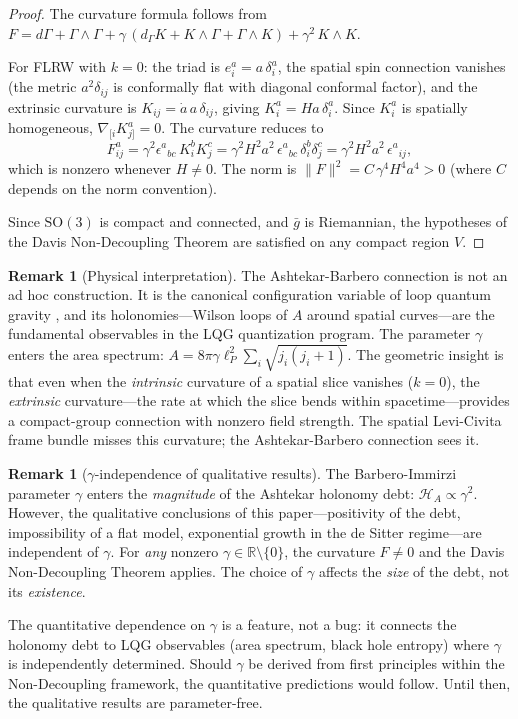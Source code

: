 \documentclass[12pt]{amsart}
\theoremstyle{definition}
\newtheorem{remark}[theorem]{Remark}
\newcommand{\R}{\mathbb{R}}
\begin{document}
\begin{proof}
The curvature formula follows from $F = d\Gamma + \Gamma \wedge \Gamma + \gamma\,(d_\Gamma K + K \wedge \Gamma + \Gamma \wedge K) + \gamma^2\, K \wedge K$.

For FLRW with $k = 0$: the triad is $e^a_i = a\,\delta^a_i$, the spatial spin connection vanishes (the metric $a^2\delta_{ij}$ is conformally flat with diagonal conformal factor), and the extrinsic curvature is $K_{ij} = \dot{a}\,a\,\delta_{ij}$, giving $K^a_i = Ha\,\delta^a_i$.  Since $K^a_i$ is spatially homogeneous, $\nabla_{[i}K^a_{j]} = 0$.  The curvature reduces to
\[
F^a_{ij} = \gamma^2\epsilon^a{}_{bc}\,K^b_i K^c_j = \gamma^2 H^2 a^2\,\epsilon^a{}_{bc}\,\delta^b_i\delta^c_j = \gamma^2 H^2 a^2\,\epsilon^a{}_{ij},
\]
which is nonzero whenever $H \neq 0$.  The norm is $\|F\|^2 = C\,\gamma^4 H^4 a^4 > 0$ (where $C$ depends on the norm convention).

Since $\mathrm{SO}(3)$ is compact and connected, and $\bar{g}$ is Riemannian, the hypotheses of the Davis Non-Decoupling Theorem \cite{davis2026} are satisfied on any compact region $V$.
\end{proof}

\begin{remark}[Physical interpretation]
The Ashtekar-Barbero connection is not an ad hoc construction.  It is the canonical configuration variable of loop quantum gravity \cite{ashtekar1986,barbero1995}, and its holonomies---Wilson loops of $A$ around spatial curves---are the fundamental observables in the LQG quantization program.  The parameter $\gamma$ enters the area spectrum: $A = 8\pi\gamma\ell_P^2\sum_i \sqrt{j_i(j_i+1)}$.  The geometric insight is that even when the \emph{intrinsic} curvature of a spatial slice vanishes ($k = 0$), the \emph{extrinsic} curvature---the rate at which the slice bends within spacetime---provides a compact-group connection with nonzero field strength.  The spatial Levi-Civita frame bundle misses this curvature; the Ashtekar-Barbero connection sees it.
\end{remark}

\begin{remark}[$\gamma$-independence of qualitative results]
\label{rmk:gamma}
The Barbero-Immirzi parameter $\gamma$ enters the \emph{magnitude} of the Ashtekar holonomy debt: $\mathcal{H}_A \propto \gamma^2$.  However, the qualitative conclusions of this paper---positivity of the debt, impossibility of a flat model, exponential growth in the de Sitter regime---are independent of $\gamma$.  For \emph{any} nonzero $\gamma \in \R \setminus \{0\}$, the curvature $F \neq 0$ and the Davis Non-Decoupling Theorem applies.  The choice of $\gamma$ affects the \emph{size} of the debt, not its \emph{existence}.

The quantitative dependence on $\gamma$ is a feature, not a bug: it connects the holonomy debt to LQG observables (area spectrum, black hole entropy) where $\gamma$ is independently determined.  Should $\gamma$ be derived from first principles within the Non-Decoupling framework, the quantitative predictions would follow.  Until then, the qualitative results are parameter-free.
\end{remark}
\end{document}
